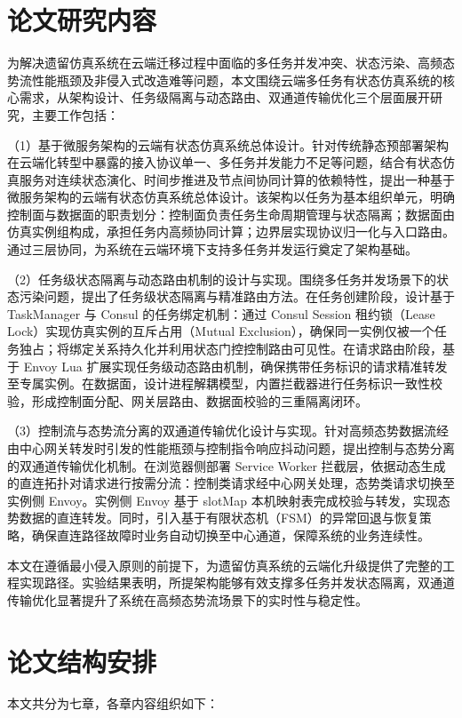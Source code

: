 \documentclass[lang=chs, degree=master, blindreview=true, winfonts=true, academic=false]{yanputhesis}
\begin{document}
\section{论文研究内容}
为解决遗留仿真系统在云端迁移过程中面临的多任务并发冲突、状态污染、高频态势流性能瓶颈及非侵入式改造难等问题，本文围绕云端多任务有状态仿真系统的核心需求，从架构设计、任务级隔离与动态路由、双通道传输优化三个层面展开研究，主要工作包括：

（1）基于微服务架构的云端有状态仿真系统总体设计。针对传统静态预部署架构在云端化转型中暴露的接入协议单一、多任务并发能力不足等问题，结合有状态仿真服务对连续状态演化、时间步推进及节点间协同计算的依赖特性，提出一种基于微服务架构的云端有状态仿真系统总体设计。该架构以任务为基本组织单元，明确控制面与数据面的职责划分：控制面负责任务生命周期管理与状态隔离；数据面由仿真实例组构成，承担任务内高频协同计算；边界层实现协议归一化与入口路由。通过三层协同，为系统在云端环境下支持多任务并发运行奠定了架构基础。

（2）任务级状态隔离与动态路由机制的设计与实现。围绕多任务并发场景下的状态污染问题，提出了任务级状态隔离与精准路由方法。在任务创建阶段，设计基于 TaskManager 与 Consul 的任务绑定机制：通过 Consul Session 租约锁（Lease Lock）实现仿真实例的互斥占用（Mutual Exclusion），确保同一实例仅被一个任务独占；将绑定关系持久化并利用状态门控控制路由可见性。在请求路由阶段，基于 Envoy Lua 扩展实现任务级动态路由机制，确保携带任务标识的请求精准转发至专属实例。在数据面，设计进程解耦模型，内置拦截器进行任务标识一致性校验，形成控制面分配、网关层路由、数据面校验的三重隔离闭环。

（3）控制流与态势流分离的双通道传输优化设计与实现。针对高频态势数据流经由中心网关转发时引发的性能瓶颈与控制指令响应抖动问题，提出控制与态势分离的双通道传输优化机制。在浏览器侧部署 Service Worker 拦截层，依据动态生成的直连拓扑对请求进行按需分流：控制类请求经中心网关处理，态势类请求切换至实例侧 Envoy。实例侧 Envoy 基于 slotMap 本机映射表完成校验与转发，实现态势数据的直连转发。同时，引入基于有限状态机（FSM）的异常回退与恢复策略，确保直连路径故障时业务自动切换至中心通道，保障系统的业务连续性。

本文在遵循最小侵入原则的前提下，为遗留仿真系统的云端化升级提供了完整的工程实现路径。实验结果表明，所提架构能够有效支撑多任务并发状态隔离，双通道传输优化显著提升了系统在高频态势流场景下的实时性与稳定性。

\section{论文结构安排}
本文共分为七章，各章内容组织如下：
\end{document}
